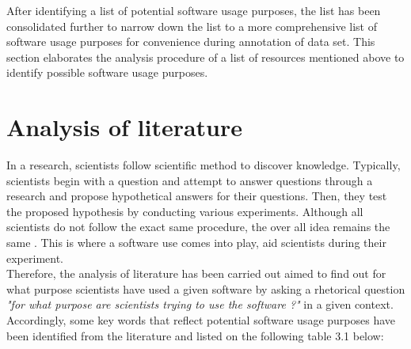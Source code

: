 After identifying a list of potential software usage purposes, the list has been consolidated further to narrow down the list to a more comprehensive list of software usage purposes for convenience during annotation of data set. This section elaborates the analysis procedure of a list of resources mentioned above to identify possible software usage purposes. \\
 

\section{Analysis of literature }
\label{sec:purpose:literatures}

In a research, scientists follow scientific method to discover knowledge. Typically, scientists begin with a question and attempt to answer questions through a research and propose hypothetical answers for their questions. Then, they test the proposed hypothesis by conducting various experiments. Although all scientists do not follow the exact same procedure, the over all idea remains the same \citep{enwiki:1061107378}. This is where a software use comes into play, aid scientists during their experiment. \\

Therefore, the analysis of literature has been carried out aimed to find out for what purpose scientists have used a given software by asking a rhetorical question \emph{ "for what purpose are scientists trying to use the software ?"} in a given context. \\

Accordingly, some key words that reflect potential software usage purposes have been identified from the literature and listed on the following table 3.1 below: \\



